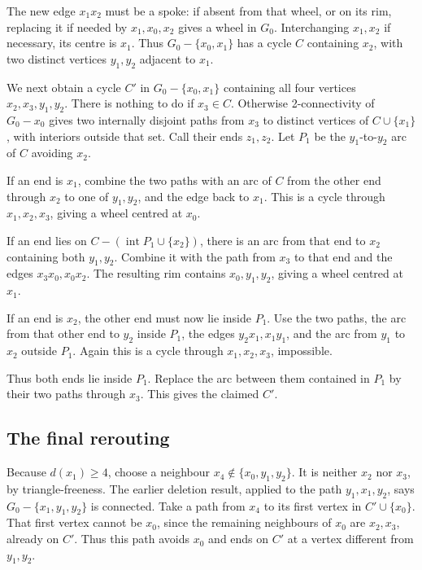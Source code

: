 The new edge \(x_1x_2\) must be a spoke: if absent from that wheel, or on its rim, replacing it if needed by \(x_1,x_0,x_2\) gives a wheel in \(G_0\).
Interchanging \(x_1,x_2\) if necessary, its centre is \(x_1\).
Thus \(G_0-\{x_0,x_1\}\) has a cycle \(C\) containing \(x_2\), with two distinct vertices \(y_1,y_2\) adjacent to \(x_1\).

We next obtain a cycle \(C'\) in \(G_0-\{x_0,x_1\}\) containing all four vertices \(x_2,x_3,y_1,y_2\).
There is nothing to do if \(x_3\in C\).
Otherwise 2-connectivity of \(G_0-x_0\) gives two internally disjoint paths from \(x_3\) to distinct vertices of \(C\cup\{x_1\}\), with interiors outside that set.
Call their ends \(z_1,z_2\).
Let \(P_1\) be the \(y_1\)-to-\(y_2\) arc of \(C\) avoiding \(x_2\).

If an end is \(x_1\), combine the two paths with an arc of \(C\) from the other end through \(x_2\) to one of \(y_1,y_2\), and the edge back to \(x_1\).
This is a cycle through \(x_1,x_2,x_3\), giving a wheel centred at \(x_0\).

If an end lies on \(C-(\operatorname{int}P_1\cup\{x_2\})\), there is an arc from that end to \(x_2\) containing both \(y_1,y_2\).
Combine it with the path from \(x_3\) to that end and the edges \(x_3x_0,x_0x_2\).
The resulting rim contains \(x_0,y_1,y_2\), giving a wheel centred at \(x_1\).

If an end is \(x_2\), the other end must now lie inside \(P_1\).
Use the two paths, the arc from that other end to \(y_2\) inside \(P_1\), the edges \(y_2x_1,x_1y_1\), and the arc from \(y_1\) to \(x_2\) outside \(P_1\).
Again this is a cycle through \(x_1,x_2,x_3\), impossible.

Thus both ends lie inside \(P_1\).
Replace the arc between them contained in \(P_1\) by their two paths through \(x_3\).
This gives the claimed \(C'\).

\subsection*{The final rerouting}
Because \(d(x_1)\geq4\), choose a neighbour
\(x_4\notin\{x_0,y_1,y_2\}\).
It is neither \(x_2\) nor \(x_3\), by triangle-freeness.
The earlier deletion result, applied to the path \(y_1,x_1,y_2\), says
\(G_0-\{x_1,y_1,y_2\}\) is connected.
Take a path from \(x_4\) to its first vertex in \(C'\cup\{x_0\}\).
That first vertex cannot be \(x_0\), since the remaining neighbours of \(x_0\) are \(x_2,x_3\), already on \(C'\).
Thus this path avoids \(x_0\) and ends on \(C'\) at a vertex different from \(y_1,y_2\).

